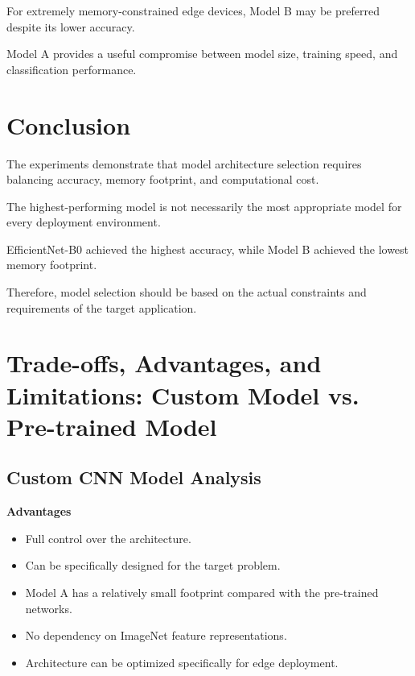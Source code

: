 \documentclass[12pt,a4paper]{report}
\begin{document}
For extremely memory-constrained edge devices, Model B may be
preferred despite its lower accuracy.

Model A provides a useful compromise between model size,
training speed, and classification performance.

\section{Conclusion}

The experiments demonstrate that model architecture selection
requires balancing accuracy, memory footprint, and computational
cost.

The highest-performing model is not necessarily the most
appropriate model for every deployment environment.

EfficientNet-B0 achieved the highest accuracy, while Model B
achieved the lowest memory footprint.

Therefore, model selection should be based on the actual
constraints and requirements of the target application.

\section{Trade-offs, Advantages, and Limitations:
Custom Model vs. Pre-trained Model}

\subsection{Custom CNN Model Analysis}

\textbf{Advantages}

\begin{itemize}
    \item Full control over the architecture.
    \item Can be specifically designed for the target problem.
    \item Model A has a relatively small footprint compared with
    the pre-trained networks.
    \item No dependency on ImageNet feature representations.
    \item Architecture can be optimized specifically for edge
    deployment.
\end{itemize}
\end{document}
